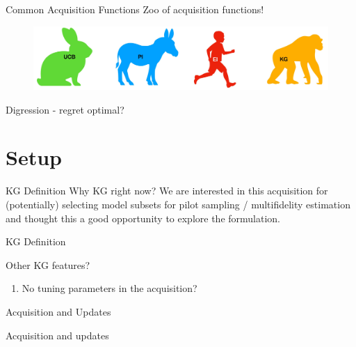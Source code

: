 \documentclass[usenames,dvipsnames]{beamer}
\theoremstyle{definition}
\begin{document}
\begin{frame}{Common Acquisition Functions}
    Zoo of acquisition functions!
    \begin{figure}[H]
        \centering
        \includegraphics[width=\textwidth]{acquisition_function_zoo.jpg}
        \caption{}
        \label{fig: acq_zoo}
    \end{figure}
    
\end{frame}

\begin{frame}{Digression - regret optimal?}
    
\end{frame}
\section{Setup}
\begin{frame}{KG Definition}
Why KG right now? We are interested in this acquisition for (potentially) selecting model subsets for pilot sampling / multifidelity estimation and thought this a good opportunity to explore the formulation.


\end{frame}

\begin{frame}{KG Definition}
    
\end{frame}

\begin{frame}{Other KG features?}
    \begin{enumerate}
        \item No tuning parameters in the acquisition?
    \end{enumerate}
\end{frame}


\begin{frame}{Acquisition and Updates}
    
\end{frame}

\begin{frame}{Acquisition and updates}


\end{frame}
\end{document}
